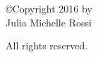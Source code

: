 \documentclass[11pt]{Thesis} %
\begin{document}
%
\thispagestyle{empty}
\vspace*{\fill}
\begin{center}
\copyright Copyright 2016 by \\
Julia Michelle Rossi \\
\vspace*{1em}

All rights reserved.
\end{center}
\vspace*{\fill}
%
% 
% 
%
\clearpage %


\newpage
\thispagestyle{empty}
\mbox{}
\clearpage
\end{document}
